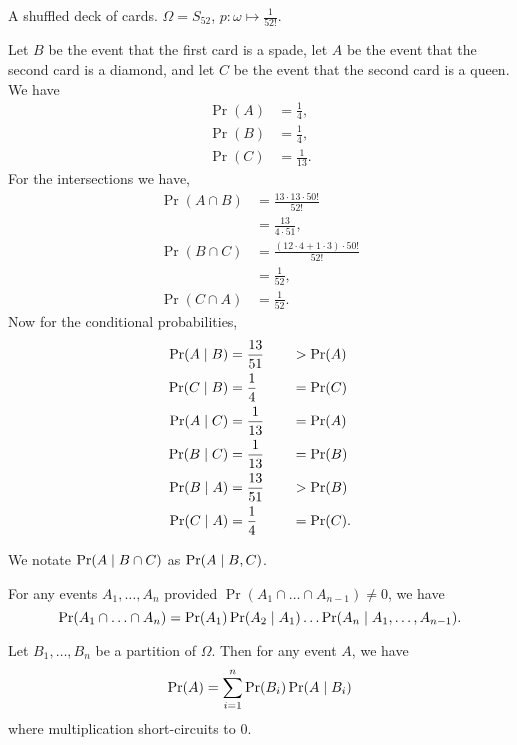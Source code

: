 \begin{examples}
    \item A shuffled deck of cards.
        $\Omega = S_{52}$, $p : \omega \mapsto \frac{1}{52!}$.
        
        Let $B$ be the event that the first card is a spade,
        let $A$ be the event that the second card is a diamond,
        and let $C$ be the event that the second card is a queen.
        We have \begin{align*}
            \Pr(A) &= \frac{1}{4}, \\
            \Pr(B) &= \frac{1}{4}, \\
            \Pr(C) &= \frac{1}{13}.
        \end{align*}
        For the intersections we have, \begin{align*}
            \Pr(A \cap B) &= \frac{13 \cdot 13 \cdot 50!}{52!} \\
                &= \frac{13}{4 \cdot 51}, \\
            \Pr(B \cap C) &= \frac{(12 \cdot 4 + 1 \cdot 3) \cdot 50!}{52!} \\
                &= \frac{1}{52}, \\
            \Pr(C \cap A) &= \frac{1}{52}.
        \end{align*}
        Now for the conditional probabilities, 
        \begin{alignat*}{2}
            \Pr(A \mid B) &= \frac{13}{51} \quad&&> \Pr(A) \\
            \Pr(C \mid B) &= \frac{1}{4} \quad&&= \Pr(C) \\
            \Pr(A \mid C) &= \frac{1}{13} \quad&&= \Pr(A) \\
            \Pr(B \mid C) &= \frac{1}{13} \quad&&= \Pr(B) \\
            \Pr(B \mid A) &= \frac{13}{51} \quad&&> \Pr(B) \\
            \Pr(C \mid A) &= \frac{1}{4} \quad&&= \Pr(C).
        \end{alignat*}
\end{examples}
\begin{notation}
    We notate $\Pr(A \mid B \cap C)$ as $\Pr(A \mid B, C)$.
\end{notation}
\begin{proposition}[Intersections] \label{thm:conditional:intersections}
    For any events $A_1, \dots, A_n$ provided
    $\Pr(A_1 \cap \ldots \cap A_{n -1}) \neq 0$, we have \[
        \Pr(A_1 \cap \ldots \cap A_n) = \Pr(A_1) \Pr(A_2 \mid A_1) \dots \Pr(A_n \mid A_1, \dots, A_{n - 1}).
    \]
\end{proposition}
\begin{proposition} \label{thm:conditional:total}
    Let $B_1, \dots, B_n$ be a partition of $\Omega$.
    Then for any event $A$, we have \[
        \Pr(A) = \sum_{i = 1}^{n} \Pr(B_i) \Pr(A \mid B_i)
    \] where multiplication short-circuits to $0$.
\end{proposition}

